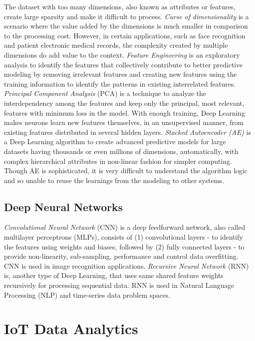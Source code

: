 \documentclass[sigconf]{acmart}
\begin{document}
	The dataset with too many dimensions, also known as attributes or features, create large sparsity and make it difficult to process. {\em Curse of dimensionality} is a scenario where the value added by the dimensions is much smaller in comparison to the processing cost. However, in certain applications, such as face recognition and patient electronic medical records, the complexity created by multiple dimensions do add value to the context. {\em Feature Engineering} is an exploratory analysis to identify the features that collectively contribute to better predictive modeling by removing irrelevant features and creating new features using the training information to identify the patterns in existing interrelated features. {\em Principal Component Analysis} (PCA) is a technique to analyze the interdependency among the features and keep only the principal, most relevant, features with minimum loss in the model. With enough training, Deep Learning makes neurons learn new features themselves, in an unsupervised manner, from existing features distributed in several hidden layers. {\em Stacked Autoencoder (AE)} is a Deep Learning algorithm to create advanced predictive models for large datasets having thousands or even millions of dimensions, automatically, with complex hierarchical attributes in non-linear fashion for simpler computing. Though AE is sophisticated, it is very difficult to understand the algorithm logic and so unable to reuse the learnings from the modeling to other systems. 
		
	
	\subsection{Deep Neural Networks}
	
	{\em Convolutional Neural Network} (CNN) is a deep feedforward network, also called multilayer perceptrons (MLPs), consists of (1) convolutional layers - to identify the features using weights and biases, followed by (2) fully connected layers - to provide non-linearity, sub-sampling, performance and control data overfitting. CNN is used in image recognition applications. {\em Recursive Neural Network} (RNN) is, another type of Deep Learning, that uses same shared feature weights recursively for processing sequential data. RNN is used in Natural Language Processing (NLP) and time-series data problem spaces.  	

	\section{IoT Data Analytics}
	
\end{document}
